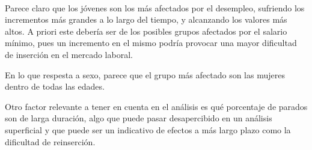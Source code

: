 \documentclass[11pt]{article}
\begin{document}
    \begin{center}
    \end{center}
    { \hspace*{\fill} \\}
    
    Parece claro que los jóvenes son los más afectados por el desempleo,
sufriendo los incrementos más grandes a lo largo del tiempo, y
alcanzando los valores más altos. A priori este debería ser de los
posibles grupos afectados por el salario mínimo, pues un incremento en
el mismo podría provocar una mayor dificultad de inserción en el mercado
laboral.

En lo que respesta a sexo, parece que el grupo más afectado son las
mujeres dentro de todas las edades.

    Otro factor relevante a tener en cuenta en el análisis es qué porcentaje
de parados son de larga duración, algo que puede pasar desapercibido en
un análisis superficial y que puede ser un indicativo de efectos a más
largo plazo como la dificultad de reinserción.
\end{document}
